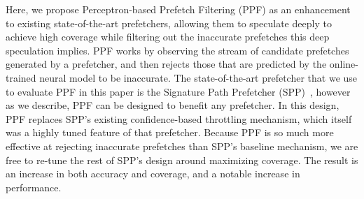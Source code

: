 

Here, we propose Perceptron-based Prefetch Filtering (PPF) as an
enhancement to existing state-of-the-art prefetchers, allowing them to
speculate deeply to achieve high coverage while filtering out the
inaccurate prefetches this deep speculation implies.  PPF works by
observing the stream of candidate prefetches generated by a
prefetcher, and then rejects those that are predicted by the
online-trained neural model to be inaccurate.  The state-of-the-art
prefetcher that we use to evaluate PPF in this paper is the Signature
Path Prefetcher (SPP)~\cite{SPP}, however as we describe, PPF can be
designed to benefit any prefetcher.  In this design, PPF replaces
SPP's existing confidence-based throttling mechanism, which itself was
a highly tuned feature of that prefetcher.  Because PPF is so much
more effective at rejecting inaccurate prefetches than SPP's baseline
mechanism, we are free to re-tune the rest of SPP's design around
maximizing coverage. The result is an increase in both accuracy and
coverage, and a notable increase in performance.


